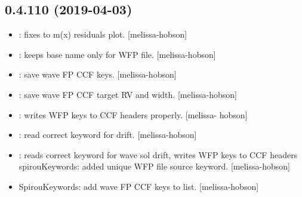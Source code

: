 \documentclass[a4paper,10pt,english]{report}
\begin{document}
\subsection{0.4.110 (2019-04-03)}
\label{\detokenize{misc/changelog:id152}}\begin{itemize}
\item {} 
: fixes to m(x) residuals plot. {[}melissa-hobson{]}

\item {} 
: keeps base name only for WFP file. {[}melissa-hobson{]}

\item {} 
: save wave FP CCF keys. {[}melissa-hobson{]}

\item {} 
: save wave FP CCF target RV and width. {[}melissa-hobson{]}

\item {} 
: writes WFP keys to CCF headers properly. {[}melissa-
hobson{]}

\item {} 
: read correct keyword for drift. {[}melissa-hobson{]}

\item {} 
: reads correct keyword for wave sol drift, writes WFP
keys to CCF headers spirouKeywords: added unique WFP file source
keyword. {[}melissa-hobson{]}

\item {} 
SpirouKeywords: add wave FP CCF keys to list. {[}melissa-hobson{]}

\end{itemize}
\end{document}
